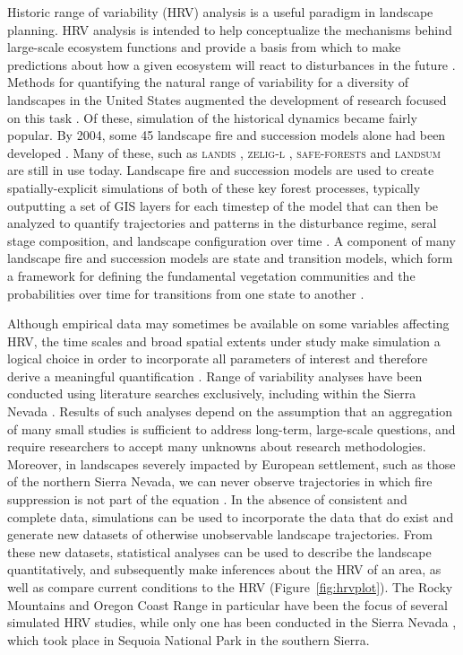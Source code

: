 Historic range of variability (HRV) analysis is a useful paradigm in landscape planning. HRV analysis is intended to help conceptualize the mechanisms behind large-scale ecosystem functions and provide a basis from which to make predictions about how a given ecosystem will react to disturbances in the future \citep{Nonaka2005,Landres1999}. Methods for quantifying the natural range of variability for a diversity of landscapes in the United States augmented the development of research focused on this task \citep{Landres1999}. Of these, simulation of the historical dynamics became fairly popular. By 2004, some 45 landscape fire and succession models alone had been developed \citep{Keane2004}. Many of these, such as \textsc{landis} \citep{He1999}, \textsc{zelig-l} \citep{Miller1999}, \textsc{safe-forests} \cite{Sessions1997} and \textsc{landsum} \citep{Keane2012} are still in use today. Landscape fire and succession models are used to create spatially-explicit simulations of both of these key forest processes, typically outputting a set of GIS layers for each timestep of the model that can then be analyzed to quantify trajectories and patterns in the disturbance regime, seral stage composition, and landscape configuration over time \citep{Keane2004}. A component of many landscape fire and succession models are state and transition models, which form a framework for defining the fundamental vegetation communities and the probabilities over time for transitions from one state to another \citep{Stringham2003,Blankenship2015}.

Although empirical data may sometimes be available on some variables affecting HRV, the time scales and broad spatial extents under study make simulation a logical choice in order to incorporate all parameters of interest and therefore derive a meaningful quantification \citep{Swetnam1999,Mladenoff1999}. Range of variability analyses have been conducted using literature searches exclusively, including within the Sierra Nevada \citep{Safford2013}. Results of such analyses depend on the assumption that an aggregation of many small studies is sufficient to address long-term, large-scale questions, and require researchers to accept many unknowns about research methodologies. Moreover, in landscapes severely impacted by European settlement, such as those of the northern Sierra Nevada, we can never observe trajectories in which fire suppression is not part of the equation \citep{Keane2012}. In the absence of consistent and complete data, simulations can be used to incorporate the data that do exist and generate new datasets of otherwise unobservable landscape trajectories. From these new datasets, statistical analyses can be used to describe the landscape quantitatively, and subsequently make inferences about the HRV of an area, as well as compare current conditions to the HRV (Figure~\ref{fig:hrvplot}). The Rocky Mountains and Oregon Coast Range in particular have been the focus of several simulated HRV studies, while only one has been conducted in the Sierra Nevada \citep{Miller1999}, which took place in Sequoia National Park in the southern Sierra. 

